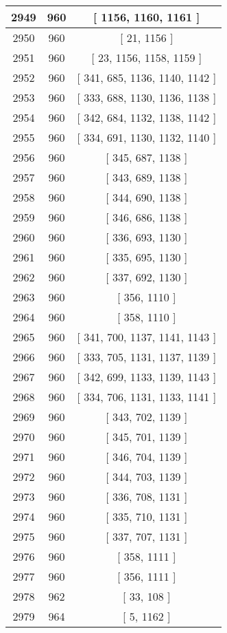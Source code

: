 \begin{center}
\begin{longtable}[H]{|| c c c ||}
\hline
2949 & 960 & [ 1156, 1160, 1161 ] \\ 
\hline
2950 & 960 & [ 21, 1156 ] \\ 
\hline
2951 & 960 & [ 23, 1156, 1158, 1159 ] \\ 
\hline
2952 & 960 & [ 341, 685, 1136, 1140, 1142 ] \\ 
\hline
2953 & 960 & [ 333, 688, 1130, 1136, 1138 ] \\ 
\hline
2954 & 960 & [ 342, 684, 1132, 1138, 1142 ] \\ 
\hline
2955 & 960 & [ 334, 691, 1130, 1132, 1140 ] \\ 
\hline
2956 & 960 & [ 345, 687, 1138 ] \\ 
\hline
2957 & 960 & [ 343, 689, 1138 ] \\ 
\hline
2958 & 960 & [ 344, 690, 1138 ] \\ 
\hline
2959 & 960 & [ 346, 686, 1138 ] \\ 
\hline
2960 & 960 & [ 336, 693, 1130 ] \\ 
\hline
2961 & 960 & [ 335, 695, 1130 ] \\ 
\hline
2962 & 960 & [ 337, 692, 1130 ] \\ 
\hline
2963 & 960 & [ 356, 1110 ] \\ 
\hline
2964 & 960 & [ 358, 1110 ] \\ 
\hline
2965 & 960 & [ 341, 700, 1137, 1141, 1143 ] \\ 
\hline
2966 & 960 & [ 333, 705, 1131, 1137, 1139 ] \\ 
\hline
2967 & 960 & [ 342, 699, 1133, 1139, 1143 ] \\ 
\hline
2968 & 960 & [ 334, 706, 1131, 1133, 1141 ] \\ 
\hline
2969 & 960 & [ 343, 702, 1139 ] \\ 
\hline
2970 & 960 & [ 345, 701, 1139 ] \\ 
\hline
2971 & 960 & [ 346, 704, 1139 ] \\ 
\hline
2972 & 960 & [ 344, 703, 1139 ] \\ 
\hline
2973 & 960 & [ 336, 708, 1131 ] \\ 
\hline
2974 & 960 & [ 335, 710, 1131 ] \\ 
\hline
2975 & 960 & [ 337, 707, 1131 ] \\ 
\hline
2976 & 960 & [ 358, 1111 ] \\ 
\hline
2977 & 960 & [ 356, 1111 ] \\ 
\hline
2978 & 962 & [ 33, 108 ] \\ 
\hline
2979 & 964 & [ 5, 1162 ] \\ 

\end{longtable}
\end{center}
